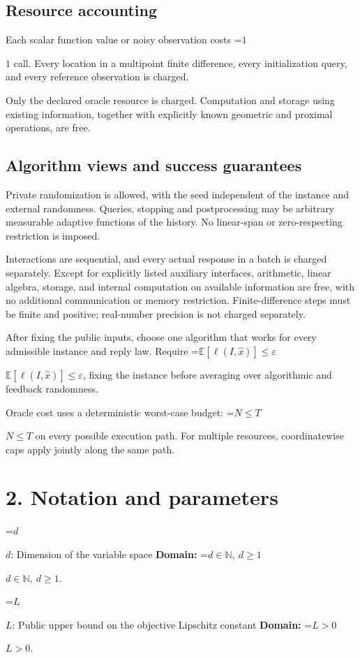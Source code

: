 \documentclass[10pt,a4paper]{article}
\newcommand{\AtlasMath}[1]{\par\begingroup\centering\setbox0=\hbox{$\displaystyle #1$}\ifdim\wd0>1.4\linewidth\typeout{ATLAS WIDE FORMULA: \the\wd0}\fi\ifdim\wd0>\linewidth\resizebox{\linewidth}{!}{\box0}\else\box0\fi\par\endgroup}
\newcommand{\AtlasInlineMath}[1]{\begingroup\setbox0=\hbox{$#1$}\ifdim\wd0>.4\linewidth\endgroup\AtlasMath{#1}\else\endgroup$#1$\fi}
\begin{document}
\subsection{Resource accounting}
Each scalar function value or noisy observation costs \AtlasInlineMath{1} call. Every location in a multipoint finite difference, every initialization query, and every reference observation is charged.

Only the declared oracle resource is charged. Computation and storage using existing information, together with explicitly known geometric and proximal operations, are free.

\subsection{Algorithm views and success guarantees}
Private randomization is allowed, with the seed independent of the instance and external randomness. Queries, stopping and postprocessing may be arbitrary measurable adaptive functions of the history. No linear-span or zero-respecting restriction is imposed.

Interactions are sequential, and every actual response in a batch is charged separately. Except for explicitly listed auxiliary interfaces, arithmetic, linear algebra, storage, and internal computation on available information are free, with no additional communication or memory restriction. Finite-difference steps must be finite and positive; real-number precision is not charged separately.

After fixing the public inputs, choose one algorithm that works for every admissible instance and reply law. Require \AtlasInlineMath{\mathbb{E}[\ell(I,\widehat{x})]\le \varepsilon}, fixing the instance before averaging over algorithmic and feedback randomness.

Oracle cost uses a deterministic worst-case budget: \AtlasInlineMath{N\le T} on every possible execution path. For multiple resources, coordinatewise caps apply jointly along the same path.

\section{2. Notation and parameters}
\AtlasInlineMath{d}: Dimension of the variable space \textbf{Domain:} \AtlasInlineMath{d\in\mathbb{N},\ d\ge1}.

\AtlasInlineMath{L}: Public upper bound on the objective Lipschitz constant \textbf{Domain:} \AtlasInlineMath{L>0}.
\end{document}
